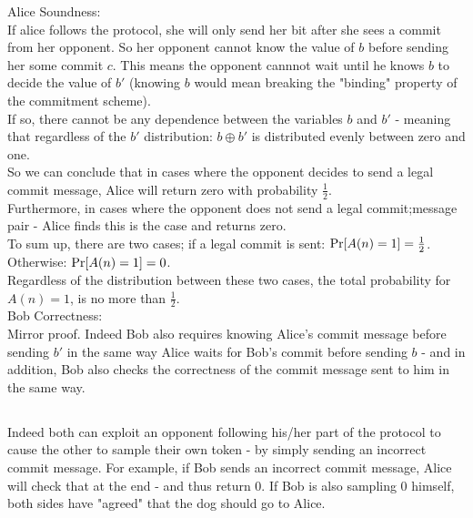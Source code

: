 Alice Soundness:\\
If alice follows the protocol, she will only send her bit after she 
sees a commit from her opponent. So her opponent cannot know the value
of $b$ before sending her some commit $c$. This means the opponent cannnot
wait until he knows $b$ to decide the value of $b'$ (knowing $b$ would mean breaking
the "binding" property of the commitment scheme).\\
If so, there cannot be any dependence between the variables
$b$ and $b'$ - meaning that regardless of the $b'$ distribution: $b\oplus b'$ is distributed
evenly between zero and one.\\
So we can conclude that in cases where the opponent decides
to send a legal commit message, Alice will return zero with probability $\frac{1}{2}$.\\

Furthermore, in cases where the opponent does not send a legal commit;message pair - Alice
finds this is the case and returns zero.\\

To sum up, there are two cases; if a legal commit is sent: $\operatorname*{Pr}[A(n)=1]=\frac{1}{2}$.
Otherwise: $\operatorname*{Pr}[A(n)=1]=0$.\\
Regardless of the distribution between these two cases, the total
probability for $A(n)=1$, is no more than $\frac{1}{2}$.\\

Bob Correctness:\\
Mirror proof. Indeed Bob also requires knowing Alice's commit message
before sending $b'$ in the same way Alice waits for Bob's commit before
sending $b$ - and in addition, Bob also checks the correctness of the commit
message sent to him in the same way.

\subsection{}
Indeed both can exploit an opponent following his/her part of the protocol
to cause the other to sample their own token - by simply sending an incorrect
commit message. For example, if Bob sends an incorrect commit message,
Alice will check that at the end - and thus return 0. If Bob is also
sampling 0 himself, both sides have "agreed" that the dog should go to Alice.
